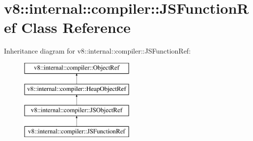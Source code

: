 \hypertarget{classv8_1_1internal_1_1compiler_1_1JSFunctionRef}{}\section{v8\+:\+:internal\+:\+:compiler\+:\+:J\+S\+Function\+Ref Class Reference}
\label{classv8_1_1internal_1_1compiler_1_1JSFunctionRef}
Inheritance diagram for v8\+:\+:internal\+:\+:compiler\+:\+:J\+S\+Function\+Ref\+:\begin{figure}[H]
\begin{center}
\leavevmode
\includegraphics[height=4.000000cm]{classv8_1_1internal_1_1compiler_1_1JSFunctionRef}
\end{center}
\end{figure}
